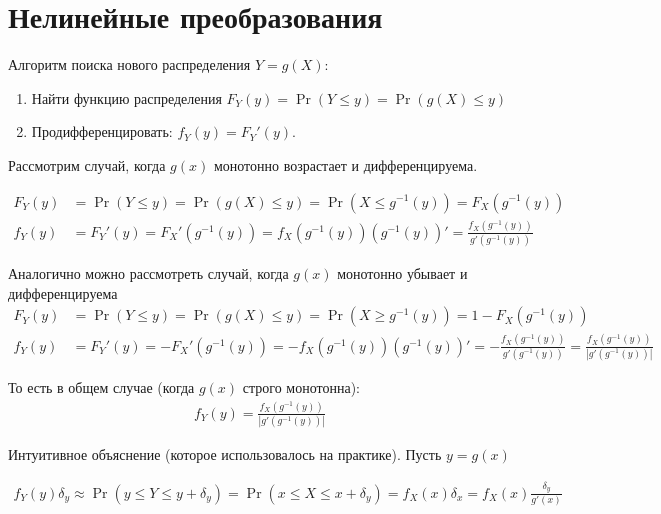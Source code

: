 \documentclass[12pt]{article}
\begin{document}
\section{Нелинейные преобразования}

Алгоритм поиска нового распределения $Y = g(X)$:
\begin{enumerate}
  \item Найти функцию распределения $F_Y(y) = \Pr(Y \le y) = \Pr(g(X) \le y)$
  \item Продифференцировать: $f_Y(y) = F_Y'(y)$.
\end{enumerate}

Рассмотрим случай, когда $g(x)$ монотонно возрастает и дифференцируема.

\begin{align*}
  F_Y(y) &= \Pr(Y \le y) = \Pr(g(X) \le y) = \Pr(X \le g^{-1}(y)) = F_X(g^{-1}(y)) \\
  f_Y(y) &= F_Y'(y) = F_X'(g^{-1}(y)) = f_X(g^{-1}(y)) (g^{-1}(y))' = \frac{f_X(g^{-1}(y))}{g'(g^{-1}(y))}
\end{align*}

Аналогично можно рассмотреть случай, когда $g(x)$ монотонно убывает и дифференцируема
\begin{align*}
  F_Y(y) &= \Pr(Y \le y) = \Pr(g(X) \le y) = \Pr(X \ge g^{-1}(y)) = 1 - F_X(g^{-1}(y)) \\
  f_Y(y) &= F_Y'(y) = -F_X'(g^{-1}(y)) = -f_X(g^{-1}(y)) (g^{-1}(y))' = -\frac{f_X(g^{-1}(y))}{g'(g^{-1}(y))} = \frac{f_X(g^{-1}(y))}{|g'(g^{-1}(y))|}
\end{align*}

То есть в общем случае (когда $g(x)$ строго монотонна):
\begin{align*}
  f_Y(y) = \frac{f_X(g^{-1}(y))}{|g'(g^{-1}(y))|}
\end{align*}

Интуитивное объяснение (которое использовалось на практике). Пусть $y = g(x)$

\begin{align*}
  f_Y(y) \delta_y \approx \Pr(y \le Y \le y + \delta_y) = \Pr(x \le X \le x + \delta_y) = f_X(x) \delta_x = f_X(x) \frac{\delta_y}{g'(x)}
\end{align*}
\end{document}
